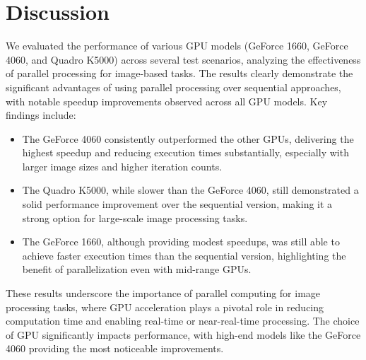 \section{Discussion}
We evaluated the performance of various GPU models (GeForce 1660, GeForce 4060, and Quadro K5000) across several test scenarios, analyzing the effectiveness of parallel processing for image-based tasks. The results clearly demonstrate the significant advantages of using parallel processing over sequential approaches, with notable speedup improvements observed across all GPU models.
Key findings include:
\begin{itemize}
    \item The GeForce 4060 consistently outperformed the other GPUs, delivering the highest speedup and reducing execution times substantially, especially with larger image sizes and higher iteration counts.
    \item The Quadro K5000, while slower than the GeForce 4060, still demonstrated a solid performance improvement over the sequential version, making it a strong option for large-scale image processing tasks.
    \item The GeForce 1660, although providing modest speedups, was still able to achieve faster execution times than the sequential version, highlighting the benefit of parallelization even with mid-range GPUs.
\end{itemize}

These results underscore the importance of parallel computing for image processing tasks, where GPU acceleration plays a pivotal role in reducing computation time and enabling real-time or near-real-time processing. The choice of GPU significantly impacts performance, with high-end models like the GeForce 4060 providing the most noticeable improvements.
